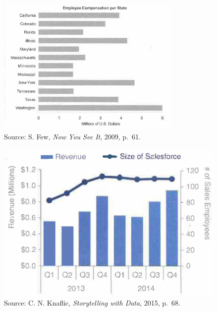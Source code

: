\documentclass[
  letterpaper,
  DIV=11,
  numbers=noendperiod]{scrreprt}
\begin{document}
\hfill\break
\hfill\break
\hfill\break

\begin{figure}[H]

{\centering \includegraphics[width=0.8\textwidth,height=\textheight]{src/../images/compensation.png}

}

\caption{Source: S. Few, \emph{Now You See It}, 2009, p.~61.}

\end{figure}%

\hfill\break
\hfill\break
\hfill\break

\begin{figure}[H]

{\centering \includegraphics[width=1\textwidth,height=\textheight]{src/../images/employees.png}

}

\caption{Source: C. N. Knaflic, \emph{Storytelling with Data}, 2015,
p.~68.}

\end{figure}%
\end{document}
